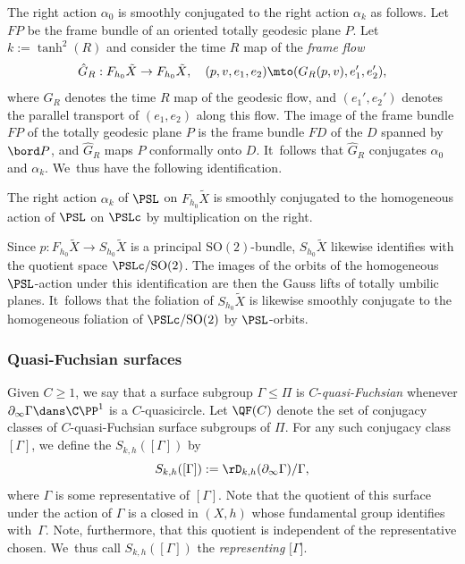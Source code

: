 The right action $\alpha_0$ is smoothly conjugated to the right action $\alpha_k$ as follows. Let $FP$ be the frame bundle of an oriented totally geodesic plane $P$. Let $k:=\tanh^2(R)$ and consider the time $R$ map of the \emph{frame flow}
\[
\hat G_R:F_{h_0}\tilde X\to F_{h_0}\tilde X,\quad(p,v,e_1,e_2)\mto(G_R(p,v),e_1',e_2'),
\]
where $G_R$ denotes the time $R$ map of the geodesic flow, and $(e_1',e_2')$ denotes the parallel transport of $(e_1,e_2)$ along this flow. The image of the frame bundle $FP$ of the totally geodesic plane $P$ is the frame bundle $FD$ of the \kdisk $D$ spanned by $\bord P$, and $\hat G_R$ maps $P$ conformally onto $D$. It~follows that $\hat G_R$ conjugates $\alpha_0$ and $\alpha_k$. We~thus have the following identification.

\begin{theorem}\label{t.homogeneous_model}
The right action $\alpha_k$ of $\PSL$ on $F_{h_0}\tilde{X}$ is smoothly conjugated to the homogeneous action of $\PSL$ on $\PSLc$ by multiplication on the right.
\end{theorem}

Since $p:F_{h_0}\tilde{X}\to S_{h_0}\tilde{X}$ is a principal $\text{SO}(2)$-bundle, $S_{h_0}\tilde{X}$ likewise identifies with the quotient space $\PSLc/\text{SO}(2)$. The images of the orbits of the homogeneous $\PSL$-action under this identification are then the Gauss lifts of totally umbilic planes. It~follows that the \ksurface foliation of $S_{h_0}\tilde{X}$ is likewise smoothly conjugate to the homogeneous foliation of $\PSLc/\text{SO}(2)$ by $\PSL$-orbits.


\subsubsection{Quasi-Fuchsian surfaces} Given $C\geq 1$, we say that a surface subgroup \hbox{$\Gamma\leq\Pi$} is $C$-\emph{quasi-Fuchsian} whenever $\partial_\infty\Gamma\dans\C\PP^1$ is a $C$-quasicircle. Let $\QF(C)$ denote the set of conjugacy classes of $C$-quasi-Fuchsian surface subgroups of $\Pi$. For any such conjugacy class $[\Gamma]$, we define the \ksurface $S_{k,h}([\Gamma])$ by
\begin{equation}\label{eq.rep_surface}
S_{k,h}([\Gamma]):=\rD_{k,h}(\partial_\infty\Gamma)/\Gamma,
\end{equation}
where $\Gamma$ is some representative of $[\Gamma]$. Note that the quotient of this surface under the action of $\Gamma$ is a closed \ksurface in $(X,h)$ whose fundamental group identifies with~$\Gamma$. Note, furthermore, that this quotient is independent of the representative chosen. We~thus call $S_{k,h}([\Gamma])$ the \ksurface \emph{representing} $[\Gamma$].

